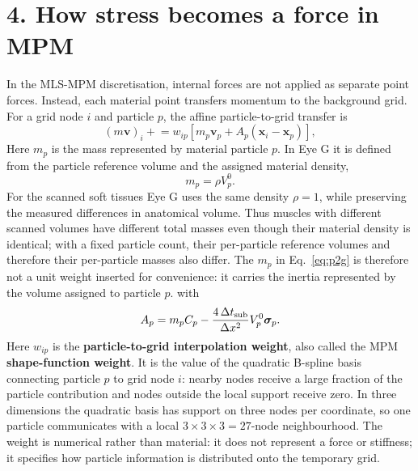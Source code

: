 \documentclass[11pt]{article}
\newcommand{\vect}[1]{\bm{#1}}
\newcommand{\sig}{\boldsymbol{\sigma}}
\begin{document}
\section*{4. How stress becomes a force in MPM}
In the MLS-MPM discretisation, internal forces are not applied as separate point forces. Instead, each material point transfers momentum to the background grid. For a grid node $i$ and particle $p$, the affine particle-to-grid transfer is
\begin{equation}
(m\vect v)_i \mathrel{+}= w_{ip}\left[m_p\vect v_p + A_p(\vect x_i-\vect x_p)\right],
\label{eq:p2g}
\end{equation}
Here $m_p$ is the mass represented by material particle $p$. In Eye G it is defined from the particle reference volume and the assigned material density,
\begin{equation}
m_p=\rho V_p^0.
\label{eq:particle-mass}
\end{equation}
For the scanned soft tissues Eye G uses the same density $\rho=1$, while preserving the measured differences in anatomical volume. Thus muscles with different scanned volumes have different total masses even though their material density is identical; with a fixed particle count, their per-particle reference volumes and therefore their per-particle masses also differ. The $m_p$ in Eq.~\eqref{eq:p2g} is therefore not a unit weight inserted for convenience: it carries the inertia represented by the volume assigned to particle $p$.
with
\begin{equation}
A_p=m_pC_p-\frac{4\,\Delta t_{\rm sub}}{\Delta x^2}V_p^0\sig_p.
\label{eq:affine}
\end{equation}
Here $w_{ip}$ is the \textbf{particle-to-grid interpolation weight}, also called the MPM \textbf{shape-function weight}. It is the value of the quadratic B-spline basis connecting particle $p$ to grid node $i$: nearby nodes receive a large fraction of the particle contribution and nodes outside the local support receive zero. In three dimensions the quadratic basis has support on three nodes per coordinate, so one particle communicates with a local $3\times3\times3=27$-node neighbourhood. The weight is numerical rather than material: it does not represent a force or stiffness; it specifies how particle information is distributed onto the temporary grid.
\end{document}
